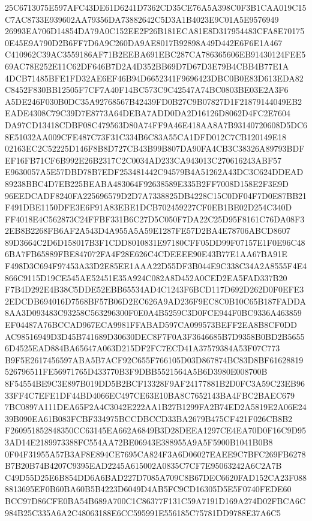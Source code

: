 \documentclass[UTF8,fontset=fandol,zihao=-4,a4paper]{ctexart}
\begin{document}
{{25C6713075E597AFC43DE61D6241D7362CD35CE76A5A398C0F3B1CAA019C15C7AC8733E939602AA79356DA73882642C5D3A1B4023E9C01A5E9576949
26993EA706D14854DA79A0C152EE2F26B181ECA81E8D317954483CFA8E701750E45E9A790D2B6FF7D6A9C260DA9AE8017B92898A49D442E6F6E1A467
C410962C39AC3559186AF71B2EEBA691EBC287CA786365606EB91430124FEE569AC78E252E11C62DF646B7D2A4D352BB69D7D67D3E79B4CBB4B77E1A
4DCB71485BFE1FD32AE6EF46B94D6652341F9696423DBC0B0E83D613EDA82C8452F830BB12505F7CF7A40F14BC573C9C42547A74BC0803BE03E2A3F6
A5DE246F030B0DC35A92768567B42439FD0B27C9B07827D1F21879144049EB2EADE4308C79C39D7E8773A64DEBA7ADD0DA2D16126D8062D4FC2E7604
DA97CD13418CDBF08C479563D80A74FF9A46E418AA8A7B93140720608D5DC68E51032AA009CFE487C73F31C334B6C83A55CA1DFD012C7CB120149E18
02163EC2C52225D146F8B8D727CB43B99B807DA90FA4CB3C38326A89793BDFEF16FB71CF6B992E26B2317C2C0034AD233CA943013C270616243ABF57
E9630057A5E57DBD78B7EDF253481442C94579B4A51262A43DC3C624DDEAD89238BBC4D7EB225BEABA483064F92638589E335B2FF7008D158E2F3E9D
96EEDCADF8240FA225696579D2D7A7338825DB4228C15C0DF04F7D0E87BB21F491DBE1150DFE3E6F91A83EBE1DCB702459227CF0EB1BE02D254C340D
FF4018E4C562873C24FFBF331B6C27D5C050F7DA22C25D95F8161C76DA08F32EB8B2268FB6AF2A543D4A955A5A59E1287FE57D2BA4E78706ABCD8607
89D3664C2D6D158017B3F1CDD8010831E97180CFF05DD99F07157E1F0E96C486BA7FB65889FBE847072FA4F28E626C4CDEEEE90E43B77E1AA67BA91E
F498D3C694F97453A33D2E85EE1AAA22D55DF3B044E9C338C34A2A8555F4E4866C9115D19CE545AE52451E35A924C082A8D452A0CED2EA5FAD337B20
F7B4D292E4B38C5DDE52EBB65534AD4C1243F6BCD117D692D262D0F0EFE32EDCDB694016D7568BF57B06D2EC626A9AD236F9EC8C0B10C65B187FADDA
8AA3D093483C93258C563296300F0E0A4B5259C3D0FCE944F0BC9336A463859EF04487A76BCCAD967ECA9981FFABAD597CA099573BEFF2EA8B8CF0DD
AC98516949D3D45B741689D30630DEC8F7F0A3F3646685B7D9358B0BD2B56556D4525EAD884BA65647A063D215DF2FC7ECD41A37579384A53F07C773
B9F5E2617456597ABA5B7ACF92C655F766105D03D867874BC83D8BF61628819526796511FE56971765D433770B3F9DBB5521564A5B6D3980E008700B
8F54554BE9C3E897B019DD5B2BCF13328F9AF24177881B2D0FC3A59C23EB9633FF4C7EFE1DF44BD4066EC497CE63E10BA8C7652143BA4FBC2BAEC679
7BC0897A111DEA65F2A4C3042E222AA1B27B1299FA2B74ED2A5819E2A06E2439B090EA61B083FCBF334975BCCDBCCD33BA2679B475CF421F026CB8B2
F260951852848350CC63145EA662A6849B3D28DEEA1297CE4EA70D0F16C9D953AD14E2189973388FC554AA72BE06943E388955A9A5F5900B1041B0B8
0F04F31955A57B3AF8E894CE7695CA824F3A6D06027EAEE9C7BFC269FB6278B7B20B74B4207C9395EAD2245A615002A0835C7CF7E95063242A6C2A7B
C49D55D25E6B854DD6A6BAD227D7085A709C8B67DEC6620FAD152CA23F0888813695EF0B60BA60B5B4223D6049D4AB5FC9CD16305D5E5F0740FEDE60
BCC97D86CFE0BA54B689A700C1C86377F131C59A7191D169A274D02FBCA6C984B25C335A6A2C48063188E6CC595991E556185C75781DD9788E37A6C5
}}
\end{document}
